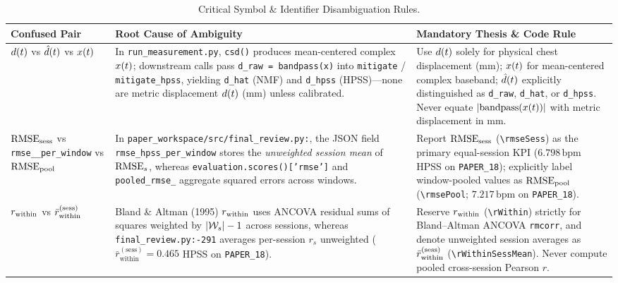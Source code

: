 \begin{table}[htbp]
\centering
\footnotesize
\setlength{\tabcolsep}{4pt}
\caption{Critical Symbol \& Identifier Disambiguation Rules.} \label{tab:notation_guardrails}
\begin{tabular}{@{}>{\raggedright\arraybackslash}p{} >{\raggedright\arraybackslash}p{} >{\raggedright\arraybackslash}p{}@{}}
\toprule
\textbf{Confused Pair} & \textbf{Root Cause of Ambiguity} & \textbf{Mandatory Thesis \& Code Rule} \\
\midrule
$d(t)$ vs $\hat{d}(t)$ vs $x(t)$ &
In \texttt{run\_\allowbreak measurement.py}, \texttt{csd()} produces mean-centered complex $x(t)$; downstream calls pass \texttt{d\_raw = bandpass(x)} into \texttt{mitigate} / \texttt{mitigate\_\allowbreak hpss}, yielding \texttt{d\_hat} (NMF) and \texttt{d\_hpss} (HPSS)---none are metric displacement $d(t)$ ($\mathrm{mm}$) unless calibrated. &
Use $d(t)$ solely for physical chest displacement ($\mathrm{mm}$); $x(t)$ for mean-centered complex baseband; $\hat{d}(t)$ explicitly distinguished as \texttt{d\_raw}, \texttt{d\_hat}, or \texttt{d\_hpss}. Never equate $|\mathrm{bandpass}(x(t))|$ with metric displacement in $\mathrm{mm}$. \\
\addlinespace
$\mathrm{RMSE}_{\mathrm{sess}}$ vs \texttt{rmse\_\allowbreak *\_\allowbreak per\_\allowbreak window} vs $\mathrm{RMSE}_{\mathrm{pool}}$ &
In \texttt{paper\_\allowbreak workspace/\allowbreak src/\allowbreak final\_\allowbreak review.py:\allowbreak 255}, the JSON field \texttt{rmse\_\allowbreak hpss\_\allowbreak per\_\allowbreak window} stores the \emph{unweighted session mean} of $\mathrm{RMSE}_{s}$, whereas \texttt{evaluation.\allowbreak scores()['rmse']} and \texttt{pooled\_\allowbreak rmse\_\allowbreak *} aggregate squared errors across windows. &
Report $\mathrm{RMSE}_{\mathrm{sess}}$ (\texttt{\textbackslash rmseSess}) as the primary equal-session KPI ($6.798\,\mathrm{bpm}$ HPSS on \texttt{PAPER\_18}); explicitly label window-pooled values as $\mathrm{RMSE}_{\mathrm{pool}}$ (\texttt{\textbackslash rmsePool}; $7.217\,\mathrm{bpm}$ on \texttt{PAPER\_18}). \\
\addlinespace
$r_{\mathrm{within}}$ vs $\bar{r}_{\mathrm{within}}^{(\mathrm{sess})}$ &
Bland \& Altman (1995) $r_{\mathrm{within}}$ uses ANCOVA residual sums of squares weighted by $|\mathcal{W}_s|-1$ across sessions, whereas \texttt{final\_\allowbreak review.py:\allowbreak 290-291} averages per-session $r_s$ unweighted ($\bar{r}_{\mathrm{within}}^{(\mathrm{sess})} = 0.465$ HPSS on \texttt{PAPER\_18}). &
Reserve $r_{\mathrm{within}}$ (\texttt{\textbackslash rWithin}) strictly for Bland--Altman ANCOVA \texttt{rmcorr}, and denote unweighted session averages as $\bar{r}_{\mathrm{within}}^{(\mathrm{sess})}$ (\texttt{\textbackslash rWithin\allowbreak SessMean}). Never compute pooled cross-session Pearson $r$. \\

\end{tabular}
\end{table}

